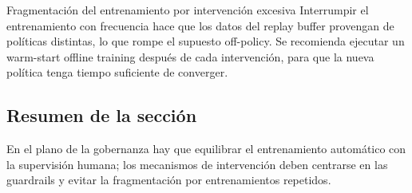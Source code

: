 \begin{warningbox}{Fragmentación del entrenamiento por intervención excesiva}
Interrumpir el entrenamiento con frecuencia hace que los datos del replay buffer provengan de políticas distintas, lo que rompe el supuesto off-policy. Se recomienda ejecutar un warm-start offline training después de cada intervención, para que la nueva política tenga tiempo suficiente de converger.
\end{warningbox}

\subsection{Resumen de la sección}

En el plano de la gobernanza hay que equilibrar el entrenamiento automático con la supervisión humana; los mecanismos de intervención deben centrarse en las guardrails y evitar la fragmentación por entrenamientos repetidos.
